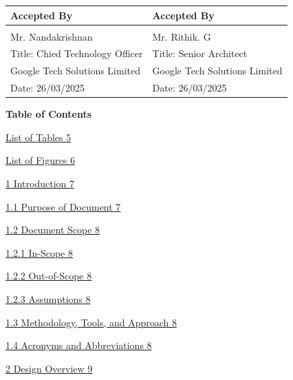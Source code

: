 \begin{longtable}[]{@{}
  >{\raggedright\arraybackslash}p{}
  >{\raggedright\arraybackslash}p{}@{}}
\toprule\noalign{}
\begin{minipage}[b]{\linewidth}\raggedright
\textbf{Accepted By}
\end{minipage} & \begin{minipage}[b]{\linewidth}\raggedright
\textbf{Accepted By}
\end{minipage} \\
\midrule\noalign{}
\endhead
\bottomrule\noalign{}
\endlastfoot
& \\
Mr. Nandakrishnan & Mr. Rithik. G \\
Title: Chied Technology Officer & Title: Senior Architect \\
Google Tech Solutions Limited & Google Tech Solutions Limited \\
Date: 26/03/2025 & Date: 26/03/2025 \\
\end{longtable}

\textbf{Table of Contents}

\hyperref[list-of-tables]{List of Tables 5}

\hyperref[list-of-figures]{List of Figures
\hyperref[list-of-figures]{6}}

\hyperref[introduction]{1 Introduction \hyperref[introduction]{7}}

\hyperref[purpose-of-document]{1.1 Purpose of Document
\hyperref[purpose-of-document]{7}}

\hyperref[X918f79d1401d26e11fe5c5060cfda901dfd4841]{1.2 Document Scope
\hyperref[X918f79d1401d26e11fe5c5060cfda901dfd4841]{8}}

\hyperref[in-scope]{1.2.1 In-Scope \hyperref[in-scope]{8}}

\hyperref[out-of-scope]{1.2.2 Out-of-Scope \hyperref[out-of-scope]{8}}

\hyperref[assumptions]{1.2.3 Assumptions \hyperref[assumptions]{8}}

\hyperref[methodology-tools-and-approach]{1.3 Methodology, Tools, and
Approach \hyperref[methodology-tools-and-approach]{8}}

\hyperref[acronyms-and-abbreviations]{1.4 Acronyms and Abbreviations
\hyperref[acronyms-and-abbreviations]{8}}

\hyperref[design-overview]{2 Design Overview
\hyperref[design-overview]{9}}


